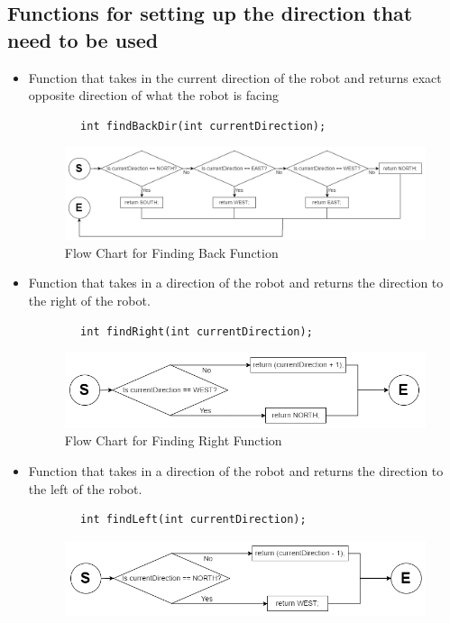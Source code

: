 \documentclass[11pt]{article}
\begin{document}

\subsection{Functions for setting up the direction that need to be used}
\begin{itemize}
\item Function that takes in the current direction of the robot and returns exact opposite direction of what the robot is facing
	\begin{verbatim}
		int findBackDir(int currentDirection);
	\end{verbatim}
\begin{figure}[htp]
\centering
\includegraphics[scale=0.45]{images/Software_Flowchart/findBackDir.png}
\caption{Flow Chart for Finding Back Function}
\label{}
\end{figure}
\item Function that takes in a direction of the robot and returns the direction to the right of the robot.
	\begin{verbatim}
		int findRight(int currentDirection);
	\end{verbatim}
\begin{figure}[htp]
\centering
\includegraphics[scale=0.47]{images/Software_Flowchart/findRight.png}
\caption{Flow Chart for Finding Right Function}
\label{}
\end{figure}	
\item Function that takes in a direction of the robot and returns the direction to the left of the robot.
	\begin{verbatim}
		int findLeft(int currentDirection);
	\end{verbatim}
\begin{figure}[htp]
\centering
\includegraphics[scale=0.48]{images/Software_Flowchart/findLeft.png}

\end{figure}
\end{itemize}
\end{document}
